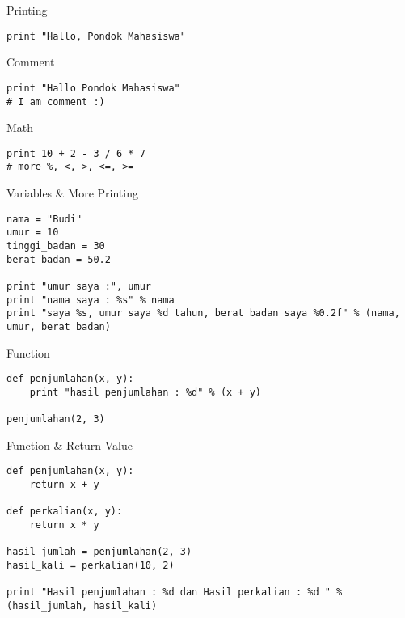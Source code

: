 \begin{xframe}{Printing}



\begin{verbatim}
print "Hallo, Pondok Mahasiswa"
\end{verbatim}
\end{xframe}

\begin{xframe}{Comment}
\begin{verbatim}
print "Hallo Pondok Mahasiswa"
# I am comment :)
\end{verbatim}
\end{xframe}

\begin{xframe}{Math}
\begin{verbatim}
print 10 + 2 - 3 / 6 * 7
# more %, <, >, <=, >=
\end{verbatim}
\end{xframe}

\begin{xframe}{Variables \& More Printing}
\begin{verbatim}
nama = "Budi"
umur = 10
tinggi_badan = 30
berat_badan = 50.2

print "umur saya :", umur
print "nama saya : %s" % nama
print "saya %s, umur saya %d tahun, berat badan saya %0.2f" % (nama, umur, berat_badan)
\end{verbatim}
\end{xframe}

\begin{xframe}{Function}
\begin{verbatim}
def penjumlahan(x, y):
    print "hasil penjumlahan : %d" % (x + y)

penjumlahan(2, 3)
\end{verbatim}
\end{xframe}

\begin{xframe}{Function \& Return Value}
\begin{verbatim}
def penjumlahan(x, y):
    return x + y

def perkalian(x, y):
    return x * y

hasil_jumlah = penjumlahan(2, 3)
hasil_kali = perkalian(10, 2)

print "Hasil penjumlahan : %d dan Hasil perkalian : %d " % (hasil_jumlah, hasil_kali)
\end{verbatim}
\end{xframe}



